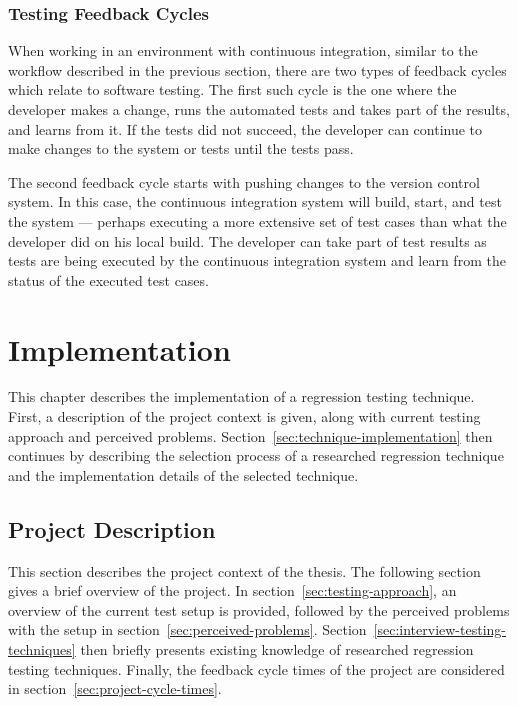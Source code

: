 \documentclass[a4paper,english,12pt]{report}
\let\Chapter\chapter
\def\chapter{\addtocontents{lol}{\protect\addvspace{10pt}}\Chapter}
\begin{document}
\subsection{Testing Feedback Cycles}
When working in an environment with continuous integration, similar to the workflow described in the previous section, there are two types of feedback cycles which relate to software testing. The first such cycle is the one where the developer makes a change, runs the automated tests and takes part of the results, and learns from it. If the tests did not succeed, the developer can continue to make changes to the system or tests until the tests pass.

The second feedback cycle starts with pushing changes to the version control system. In this case, the continuous integration system will build, start, and test the system --- perhaps executing a more extensive set of test cases than what the developer did on his local build. The developer can take part of test results as tests are being executed by the continuous integration system and learn from the status of the executed test cases.

\chapter{Implementation}\label{chap:implementation}
This chapter describes the implementation of a regression testing technique. First, a description of the project context is given, along with current testing approach and perceived problems. Section~\ref{sec:technique-implementation} then continues by describing the selection process of a researched regression technique and the implementation details of the selected technique.

\section{Project Description}\label{sec:project-description}
This section describes the project context of the thesis. The following section gives a brief overview of the project. In section~\ref{sec:testing-approach}, an overview of the current test setup is provided, followed by the perceived problems with the setup in section~\ref{sec:perceived-problems}. Section~\ref{sec:interview-testing-techniques} then briefly presents existing knowledge of researched regression testing techniques. Finally, the feedback cycle times of the project are considered in section~\ref{sec:project-cycle-times}.
\end{document}
